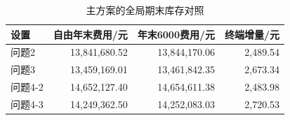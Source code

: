 \begin{table}[H]\centering\small\caption{主方案的全局期末库存对照}\label{tab:terminal}
\begin{tabular}{lrrr}\toprule
设置 & 自由年末费用/元 & 年末6000费用/元 & 终端增量/元\\\midrule
问题2 & 13,841,680.52 & 13,844,170.06 & 2,489.54\\
问题3 & 13,459,169.01 & 13,461,842.35 & 2,673.34\\
问题4-2 & 14,652,127.40 & 14,654,611.38 & 2,483.98\\
问题4-3 & 14,249,362.50 & 14,252,083.03 & 2,720.53\\
\bottomrule\end{tabular}\end{table}
